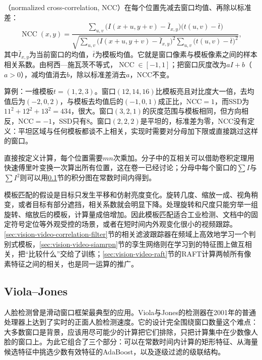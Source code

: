 （normalized cross-correlation, NCC）在每个位置先减去窗口均值、再除以标准差：
\begin{equation}
  \operatorname{NCC}(x,y)=\frac{\sum_{u,v}\bigl(I(x+u,y+v)-\bar I_{x,y}\bigr)\bigl(t(u,v)-\bar t\bigr)}
  {\sqrt{\sum_{u,v}\bigl(I(x+u,y+v)-\bar I_{x,y}\bigr)^2\sum_{u,v}\bigl(t(u,v)-\bar t\bigr)^2}},
  \label{eq:vision-features-ncc}
\end{equation}
其中$\bar I_{x,y}$为当前窗口的均值，$\bar t$为模板均值。它就是窗口像素与模板像素之间的样本相关系数。由柯西—施瓦茨不等式，$\operatorname{NCC}\in[-1,1]$；把窗口灰度改为$aI+b$（$a>0$），减均值消去$b$，除以标准差消去$a$，NCC不变。

算例：一维模板$t=(1,2,3)$。窗口$(12,14,16)$比模板亮且对比度大一倍，去均值后为$(-2,0,2)$，与模板去均值后的$(-1,0,1)$成正比，NCC$=1$，而SSD为$11^2+12^2+13^2=434$，很大。窗口$(3,2,1)$的灰度范围与模板相同，但方向相反，NCC$=-1$，SSD只有$8$。窗口$(2,2,2)$是平坦的，标准差为零，NCC没有定义：平坦区域与任何模板都谈不上相关，实现时需要对分母加下限或直接跳过这样的窗口。

直接按定义计算，每个位置需要$mn$次乘加。分子中的互相关可以借助卷积定理用快速傅里叶变换一次算出所有位置，这在卷一已经讨论；分母中每个窗口的$\sum I$与$\sum I^2$则可以用\ref{sec:vision-features-viola-jones}节的积分图在常数时间内得到。

模板匹配的假设是目标只发生平移和仿射亮度变化。旋转几度、缩放一成、视角稍变，或者目标有部分遮挡，相关系数就会明显下降。处理旋转和尺度只能穷举一组旋转、缩放后的模板，计算量成倍增加。因此模板匹配适合工业检测、文档中的固定符号定位等外观受控的场景，或者在短时间内外观变化很小的视频跟踪。\ref{sec:vision-video-correlation-filter}节的相关滤波跟踪器在频域上高效地学习一个判别式模板，\ref{sec:vision-video-siamrpn}节的孪生网络则在学习到的特征图上做互相关，把“比较什么”交给了训练；\ref{sec:vision-video-raft}节的RAFT计算两帧所有像素特征之间的相关，也是同一运算的推广。

\subsection{Viola–Jones}
\label{sec:vision-features-viola-jones}

人脸检测曾是滑动窗口框架最典型的应用。Viola与Jones的检测器在2001年的普通处理器上达到了实时的正面人脸检测速度。它的设计完全围绕窗口数量这个难点：大多数窗口是背景，应该用尽可能少的计算把它们排除，只把计算集中在少数像人脸的窗口上。为此它组合了三个部分：可以在常数时间内计算的矩形特征、从海量候选特征中挑选少数有效特征的AdaBoost，以及逐级过滤的级联结构。

